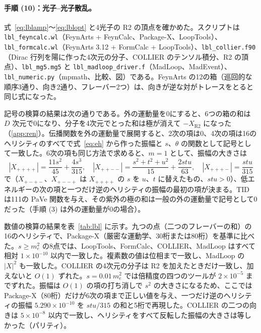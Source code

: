 \documentclass[a4paper,10pt]{ltjsarticle}
\begin{document}
\paragraph{手順 (10)：光子--光子散乱。}式~\eqref{eq:lblamp}〜\eqref{eq:lblopt} と4光子の R2 の頂点を確かめた。スクリプトは \texttt{lbl\_feyncalc.wl}（FeynArts + FeynCalc、Package-X、LoopTools）、\texttt{lbl\_formcalc.wl}（FeynArts 3.12 + FormCalc + LoopTools）、\texttt{lbl\_collier.f90}（Dirac 行列を陽に作った4次元の分子、COLLIER のテンソル積分、R2 の頂点）、\texttt{lbl\_mg5.mg5} と \texttt{lbl\_madloop\_driver.f}（MadLoop、MadEvent）、\texttt{lbl\_numeric.py}（mpmath、比較、図）である。FeynArts の12の箱（巡回的な順序3通り、向き2通り、フレーバー2つ）は、向きが逆な対がトレースをとると同じ式になった。

記号の検算の結果は次の通りである。外の運動量を0にすると、6つの箱の和は $D$ 次元で0になり、分子を4次元でとった和は極が消えて $-X_{\mathrm{R2}}$ になった（\ref{app:ren}）。伝播関数を外の運動量で展開すると、2次の項は0、4次の項は16のヘリシティのすべてで式~\eqref{eq:eh} から作った振幅と $s$、$\theta$ の関数として記号として一致した。6次の項も同じ方法で求めると、$m=1$ として、振幅の大きさは
\begin{equation*}
|X_{++++}|=\frac{11s^2}{45}+\frac{4s^3}{315},\quad|X_{++--}|=\frac{s^2+t^2+u^2}{15}+\frac{2stu}{63},\quad|X_{+++-}|=\frac{stu}{315}
\end{equation*}
で（$X_{+-+-}$、$X_{+--+}$ は $X_{++++}$ の $s$ を $u$、$t$ に替えたもの、$stu>0$）、低エネルギーの次の項と一つだけ逆のヘリシティの振幅の最初の項が決まる。TID は111の PaVe 関数を与え、その紫外の極の和は一般の外の運動量で記号として0だった（手順 (3) は外の運動量が0の場合）。

数値の検算の結果を表~\ref{tab:lbl} に示す。九つの点（二つのフレーバーの和）の16のヘリシティで、Package-X（厳密な運動学、30桁または80桁）を基準に比べた。$s\ge m_e^2$ の8点では、LoopTools、FormCalc、COLLIER、MadLoop はすべて相対 $1\times10^{-10}$ 以内で一致した。複素数の値は位相まで一致し、MadLoop の $|X|^2$ も一致した。COLLIER の4次元の分子は R2 を加えたときだけ一致し、加えないと $O(1)$ ずれた。$s=0.01\,m_e^2$ では倍精度の四つのツールが $2\times10^{-5}$ までずれた。振幅は $O(1)$ の項の打ち消しで $s^2$ の大きさになるため、ここでは Package-X（80桁）だけが6次の項まで正しい値を与え、一つだけ逆のヘリシティの振幅 $5.290\times10^{-10}$ を $stu/315$ の和と5桁で再現した。COLLIER の二つの向きは $5\times10^{-8}$ 以内で一致し、ヘリシティをすべて反転した振幅の大きさは等しかった（パリティ）。
\end{document}
